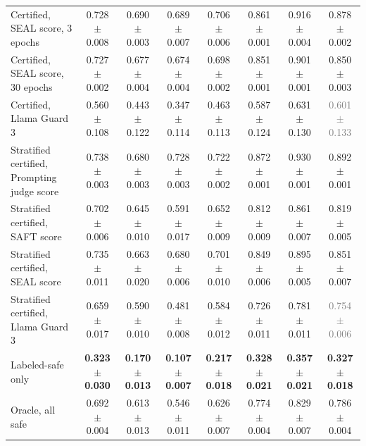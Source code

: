 \begin{tabular}{lccccccc}
Certified, SEAL score, 3 epochs & 0.728 $\pm$ 0.008 & 0.690 $\pm$ 0.003 & 0.689 $\pm$ 0.007 & 0.706 $\pm$ 0.006 & 0.861 $\pm$ 0.001 & 0.916 $\pm$ 0.004 & 0.878 $\pm$ 0.002 \\
Certified, SEAL score, 30 epochs & 0.727 $\pm$ 0.002 & 0.677 $\pm$ 0.004 & 0.674 $\pm$ 0.004 & 0.698 $\pm$ 0.002 & 0.851 $\pm$ 0.001 & 0.901 $\pm$ 0.001 & 0.850 $\pm$ 0.003 \\
Certified, Llama Guard 3 & 0.560 $\pm$ 0.108 & 0.443 $\pm$ 0.122 & 0.347 $\pm$ 0.114 & 0.463 $\pm$ 0.113 & 0.587 $\pm$ 0.124 & 0.631 $\pm$ 0.130 & \textcolor{gray}{0.601 $\pm$ 0.133} \\
Stratified certified, Prompting judge score & 0.738 $\pm$ 0.003 & 0.680 $\pm$ 0.003 & 0.728 $\pm$ 0.003 & 0.722 $\pm$ 0.002 & 0.872 $\pm$ 0.001 & 0.930 $\pm$ 0.001 & 0.892 $\pm$ 0.001 \\
Stratified certified, SAFT score & 0.702 $\pm$ 0.006 & 0.645 $\pm$ 0.010 & 0.591 $\pm$ 0.017 & 0.652 $\pm$ 0.009 & 0.812 $\pm$ 0.009 & 0.861 $\pm$ 0.007 & 0.819 $\pm$ 0.005 \\
Stratified certified, SEAL score & 0.735 $\pm$ 0.011 & 0.663 $\pm$ 0.020 & 0.680 $\pm$ 0.006 & 0.701 $\pm$ 0.010 & 0.849 $\pm$ 0.006 & 0.895 $\pm$ 0.005 & 0.851 $\pm$ 0.007 \\
Stratified certified, Llama Guard 3 & 0.659 $\pm$ 0.017 & 0.590 $\pm$ 0.010 & 0.481 $\pm$ 0.008 & 0.584 $\pm$ 0.012 & 0.726 $\pm$ 0.011 & 0.781 $\pm$ 0.011 & \textcolor{gray}{0.754 $\pm$ 0.006} \\
Labeled-safe only & \textbf{0.323 $\pm$ 0.030} & \textbf{0.170 $\pm$ 0.013} & \textbf{0.107 $\pm$ 0.007} & \textbf{0.217 $\pm$ 0.018} & \textbf{0.328 $\pm$ 0.021} & \textbf{0.357 $\pm$ 0.021} & \textbf{0.327 $\pm$ 0.018} \\
Oracle, all safe & 0.692 $\pm$ 0.004 & 0.613 $\pm$ 0.013 & 0.546 $\pm$ 0.011 & 0.626 $\pm$ 0.007 & 0.774 $\pm$ 0.004 & 0.829 $\pm$ 0.007 & 0.786 $\pm$ 0.004 \\
\bottomrule
\end{tabular}
